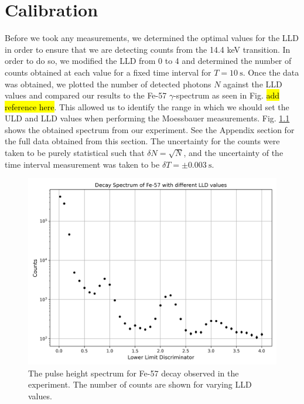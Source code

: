 \documentclass[a4paper]{report}
\numberwithin{equation}{section}
\begin{document}
\chapter{Calibration} \label{sec:calibration}

Before we took any measurements, we determined the optimal values for the LLD in order to ensure that we are 
detecting counts from the 14.4 keV transition. In order to do so, we modified the LLD from 0 to 4 and determined the number 
of counts obtained at each value for a fixed time interval for $T = \SI{10}{\second}$. Once the data was obtained, 
we plotted the number of detected photons $N$ against the LLD values and compared our results to the Fe-57 $\gamma$-spectrum as seen in Fig. \hl{add reference here}.
This allowed us to identify the range in which we should set the ULD and LLD values when performing the Moessbauer measurements. 
 Fig. \ref{fig:calibration_plot} shows the obtained spectrum from our experiment. See the Appendix section for the full data obtained from this 
 section. The uncertainty for the counts were taken to be purely statistical such that $\delta N = \sqrt{N}$, and the uncertainty 
 of the time interval measurement was taken to be $\delta T = \pm \SI{0.003}{\second}$. \par

\begin{figure}[htb!]
	\centering
	\includegraphics[width=0.7\columnwidth]{calib_plot.png}
	\caption{The pulse height spectrum for Fe-57 decay observed in the experiment. The number of counts are shown for varying 
	LLD values.}
	\label{fig:calibration_plot}
\end{figure}
\end{document}
